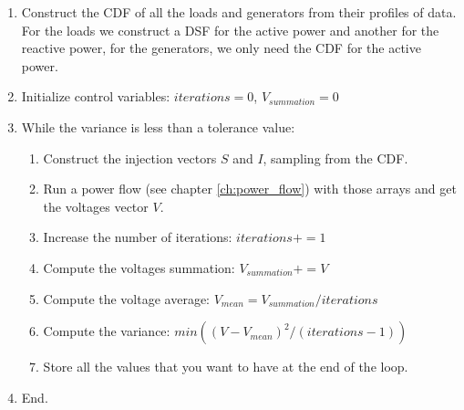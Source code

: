 \documentclass[nols,a4paper,twoside,symmetric,notoc,fleqn]{tufte-book}
\begin{document}
\begin{enumerate}
	\item Construct the CDF of all the loads and generators from their profiles of data. For the loads we construct a DSF for the active power and another for the reactive power, for the generators, we only need the CDF for the active power.
	
	\item Initialize control variables: $iterations = 0$, ${V}_{summation} = 0$
	
	\item While the variance is less than a tolerance value:
	
	\begin{enumerate}
		\item Construct the injection vectors $S$ and $I$, sampling from the CDF.
		
		\item Run a power flow (see chapter \ref{ch:power_flow}) with those arrays and get the voltages vector ${V}$.
		
		\item Increase the number of iterations: $iterations += 1$
		
		\item Compute the voltages summation: ${V}_{summation} += {V}$
		
		\item Compute the voltage average: ${V}_{mean} = {V}_{summation} / iterations$
		
		\item Compute the variance: $min(({V} - {V}_{mean})^2 / (iterations - 1))$
		
		\item Store all the values that you want to have at the end of the loop.
		
	\end{enumerate}

	\item End.
\end{enumerate}










\end{document}
